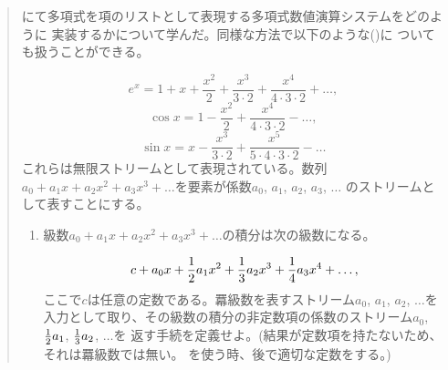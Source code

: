 \begin{quote}
にて多項式を項のリストとして表現する多項式数値演算システムをどのように
実装するかについて学んだ。同様な方法で以下のような()に
ついても扱うことができる。
\begin{comment}

\begin{example}
               x^2     x^3       x^4
e^x = 1 + x + ----- + ----- + --------- + ...
                2     3 * 2   4 * 3 * 2

             x^2       x^4
cos x = 1 - ----- + --------- - ...
              2     4 * 3 * 2

             x^3         x^5
sin x = x - ----- + ------------- - ...
            3 * 2   5 * 4 * 3 * 2
\end{example}

\end{comment}
\begin{displaymath}
e^x = 1 + x + \displaystyle\frac{x^2}{2} + \displaystyle\frac{x^3}{3 \cdot 2} + \displaystyle\frac{x^4}{4 \cdot 3 \cdot 2} + \dots, 
\end{displaymath}
\begin{displaymath}
\cos x = 1 - \displaystyle\frac{x^2}{2} + \displaystyle\frac{x^4}{4 \cdot 3 \cdot 2} - \dots, 
\end{displaymath}
\begin{displaymath}
\sin x = x - \displaystyle\frac{x^3}{3 \cdot 2} + \displaystyle\frac{x^5}{5 \cdot 4 \cdot 3 \cdot 2} - \dots 
\end{displaymath}
\noindent
これらは無限ストリームとして表現されている。数列\( a_0 +
a_1 x + a_2 x^2 + a_3 x^3 + \dots \)を要素が係数\( a_0 \), \( a_1 \), \( a_2 \), \( a_3 \), \( \dots \)
のストリームとして表すことにする。

\begin{enumerate}[a]

\item
級数\( a_0 + a_1 x + a_2 x^2 + a_3 x^3 + \dots \)の積分は次の級数になる。
\begin{comment}

\begin{example}
             1             1             1
c + a_0 x + --- a_1 x^2 + --- a_2 x^3 + --- a_3 x^4 + ...
             2             3             4
\end{example}

\end{comment}
\begin{displaymath}
 c + a_0 x + {1\over2} a_1 x^2 + {1\over3} a_2 x^3 + {1\over4} a_3 x^4 + \dots, 
\end{displaymath}
\noindent
ここで\( c \)は任意の定数である。羃級数を表すストリーム\( a_0 \), \( a_1 \), \( a_2 \), \( \dots \)を
入力として取り、その級数の積分の非定数項の係数のストリーム\( a_0 \), \( {1\over2}a_1 \), \( {1\over3}a_2 \), \( \dots \)を
返す手続を定義せよ。(結果が定数項を持たないため、それは羃級数では無い。
を使う時、後で適切な定数をする。)


\end{enumerate}
\end{quote}

